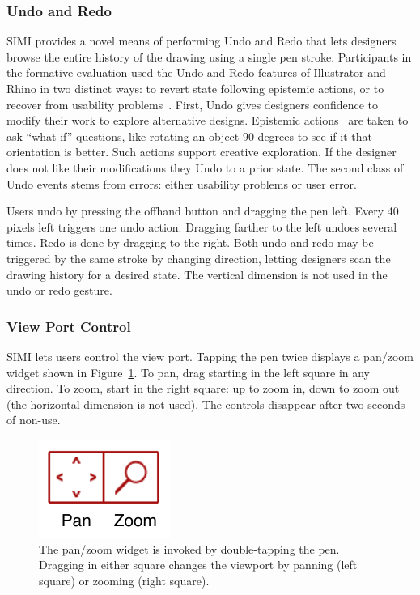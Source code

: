 \documentclass{article}
\begin{document}
\subsubsection{Undo and Redo}

SIMI provides a novel means of performing Undo and Redo that lets
designers browse the entire history of the drawing using a single pen
stroke. Participants in the formative evaluation used the Undo and
Redo features of Illustrator and Rhino in two distinct ways: to revert
state following epistemic actions, or to recover from usability
problems~\cite{akers-undo}. First, Undo gives designers confidence to
modify their work to explore alternative designs. Epistemic
actions~\cite{kirsch-epistemic-action} are taken to ask ``what if''
questions, like rotating an object 90 degrees to see if it that
orientation is better. Such actions support creative exploration. If
the designer does not like their modifications they Undo to a prior
state. The second class of Undo events stems from errors: either
usability problems or user error.

Users undo by pressing the offhand button and dragging the pen
left. Every 40 pixels left triggers one undo action. Dragging farther
to the left undoes several times. Redo is done by dragging to the
right. Both undo and redo may be triggered by the same stroke by
changing direction, letting designers scan the drawing history for a
desired state. The vertical dimension is not used in the undo or redo
gesture.

\subsubsection{View Port Control}

SIMI lets users control the view port. Tapping the pen twice displays
a pan/zoom widget shown in Figure~\ref{fig:panzoom}. To pan, drag
starting in the left square in any direction. To zoom, start in the
right square: up to zoom in, down to zoom out (the horizontal
dimension is not used). The controls disappear after two seconds of
non-use.

\begin{figure}[h]
  \centering
  \includegraphics[]{img/panzoom.pdf}
  \caption{The pan/zoom widget is invoked by double-tapping the
    pen. Dragging in either square changes the viewport by panning
    (left square) or zooming (right square).}
  \label{fig:panzoom}
\end{figure}
\end{document}

